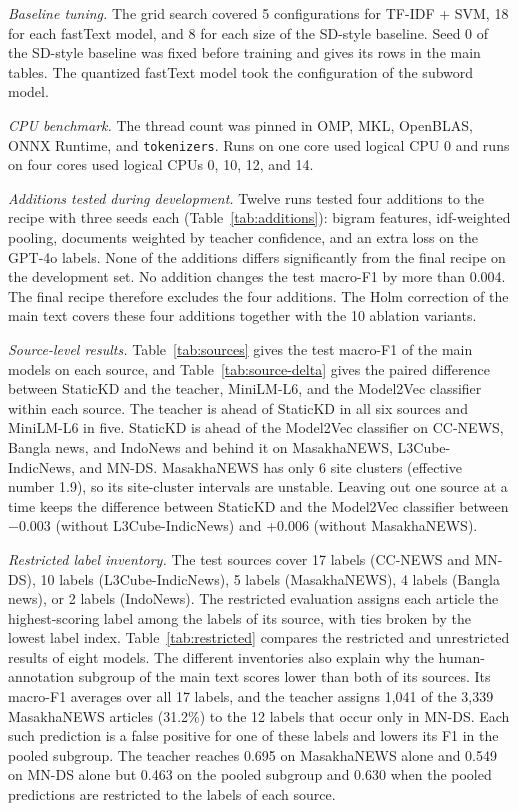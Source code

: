 \documentclass[journal,onecolumn]{IEEEtran}
\begin{document}
\textit{Baseline tuning.} The grid search covered 5 configurations for TF-IDF + SVM, 18 for each fastText model, and 8 for each size of the SD-style baseline. Seed 0 of the SD-style baseline was fixed before training and gives its rows in the main tables. The quantized fastText model took the configuration of the subword model.

\textit{CPU benchmark.} The thread count was pinned in OMP, MKL, OpenBLAS, ONNX Runtime, and \texttt{tokenizers}. Runs on one core used logical CPU 0 and runs on four cores used logical CPUs 0, 10, 12, and 14.

\textit{Additions tested during development.} Twelve runs tested four additions to the recipe with three seeds each (Table~\ref{tab:additions}): bigram features, idf-weighted pooling, documents weighted by teacher confidence, and an extra loss on the GPT-4o labels. None of the additions differs significantly from the final recipe on the development set. No addition changes the test macro-F1 by more than 0.004. The final recipe therefore excludes the four additions. The Holm correction of the main text covers these four additions together with the 10 ablation variants.

\textit{Source-level results.} Table~\ref{tab:sources} gives the test macro-F1 of the main models on each source, and Table~\ref{tab:source-delta} gives the paired difference between StaticKD and the teacher, MiniLM-L6, and the Model2Vec classifier within each source. The teacher is ahead of StaticKD in all six sources and MiniLM-L6 in five. StaticKD is ahead of the Model2Vec classifier on CC-NEWS, Bangla news, and IndoNews and behind it on MasakhaNEWS, L3Cube-IndicNews, and MN-DS. MasakhaNEWS has only 6 site clusters (effective number 1.9), so its site-cluster intervals are unstable. Leaving out one source at a time keeps the difference between StaticKD and the Model2Vec classifier between $-$0.003 (without L3Cube-IndicNews) and +0.006 (without MasakhaNEWS).

\textit{Restricted label inventory.} The test sources cover 17 labels (CC-NEWS and MN-DS), 10 labels (L3Cube-IndicNews), 5 labels (MasakhaNEWS), 4 labels (Bangla news), or 2 labels (IndoNews). The restricted evaluation assigns each article the highest-scoring label among the labels of its source, with ties broken by the lowest label index. Table~\ref{tab:restricted} compares the restricted and unrestricted results of eight models. The different inventories also explain why the human-annotation subgroup of the main text scores lower than both of its sources. Its macro-F1 averages over all 17 labels, and the teacher assigns 1,041 of the 3,339 MasakhaNEWS articles (31.2\%) to the 12 labels that occur only in MN-DS. Each such prediction is a false positive for one of these labels and lowers its F1 in the pooled subgroup. The teacher reaches 0.695 on MasakhaNEWS alone and 0.549 on MN-DS alone but 0.463 on the pooled subgroup and 0.630 when the pooled predictions are restricted to the labels of each source.
\end{document}
